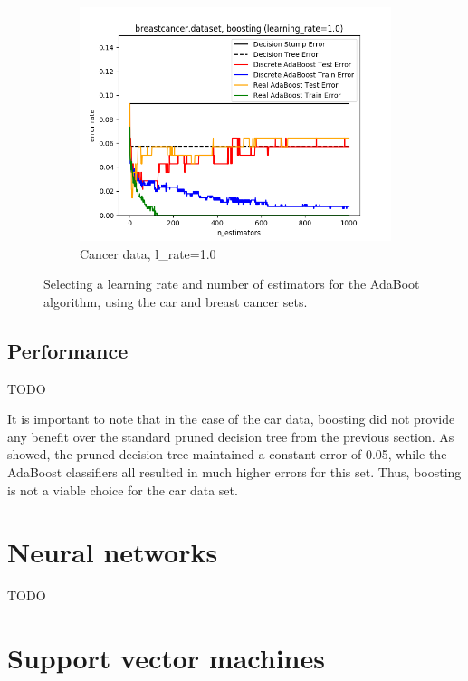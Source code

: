 \documentclass{article}
\begin{document}
\begin{figure}[htb]
\begin{subfigure}{0.33\textwidth}
      \includegraphics[width=\linewidth]{out/boosting/breastcancer-error-lrate-1.0.png}
      \caption{Cancer data, l\_rate=1.0}
      \label{fig:boosting-param-6}
    \end{subfigure}

    \caption{Selecting a learning rate and number of estimators for the AdaBoot algorithm, using the car and breast cancer sets.}
    \label{fig:boosting-param}
    \end{figure}

    \subsection{Performance}
    TODO

    It is important to note that in the case of the car data, boosting did not provide any benefit over the standard pruned decision tree from the previous section. As  showed, the pruned decision tree maintained a constant error of 0.05, while the AdaBoost classifiers all resulted in much higher errors for this set. Thus, boosting is not a viable choice for the car data set.

    \section{Neural networks}
    TODO

    \section{Support vector machines}
    
\end{document}
